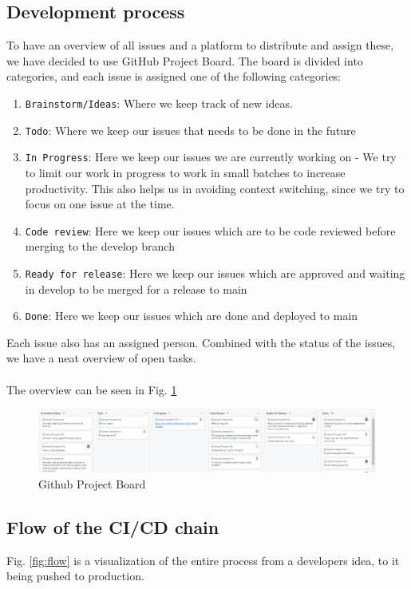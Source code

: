 \documentclass[10pt]{article}
\begin{document}
\subsection{Development process}
\label{Development_process}
To have an overview of all issues and a platform to distribute and assign these, we have decided to use GitHub Project Board.
The board is divided into categories, and each issue is assigned one of the following categories:
\begin{enumerate}
    \item \texttt{Brainstorm/Ideas}: Where we keep track of new ideas.
    \item \texttt{Todo}: Where we keep our issues that needs to be done in the future
    \item \texttt{In Progress}: Here we keep our issues we are currently working on - We try to limit our work in progress to work in small batches to increase productivity. This also helps us in avoiding context switching, since we try to focus on one issue at the time.
    \item \texttt{Code review}: Here we keep our issues which are to be code reviewed before merging to the develop branch
    \item \texttt{Ready for release}: Here we keep our issues which are approved and waiting in develop to be merged for a release to main
    \item \texttt{Done}: Here we keep our issues which are done and deployed to main
\end{enumerate}
Each issue also has an assigned person. Combined with the status of the issues, we have a neat overview of open tasks.
\\
\\
The overview can be seen in Fig. \ref{fig:Kanban}


\begin{figure}[h]
    \centering
    \includegraphics[width=\textwidth]{images/Kanban.PNG}
    \caption{Github Project Board}
    \label{fig:Kanban}
\end{figure}
\subsection{Flow of the CI/CD chain}
Fig. \ref{fig:flow} is a visualization of the entire process from a developers idea, to it being pushed to production.
\end{document}

